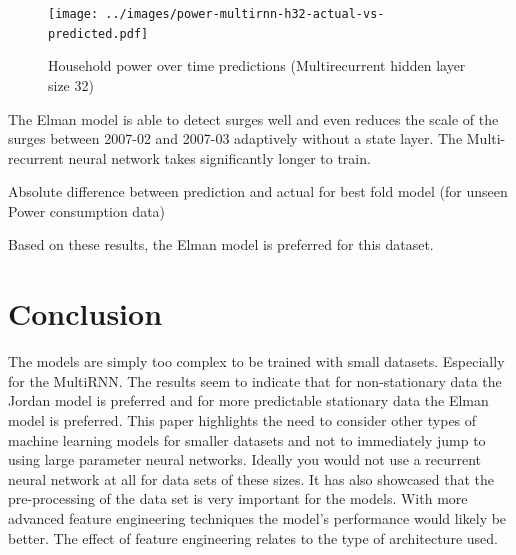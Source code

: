 \documentclass[conference]{IEEEtran}
\begin{document}
\begin{figure}[H] 
	\centering
	\texttt{[image: ../images/power-multirnn-h32-actual-vs-predicted.pdf]}
	\caption{Household power over time predictions (Multirecurrent hidden layer size 32)}
	\label{fig:power-predictions-multi}
\end{figure}

The Elman model is able to detect surges well and even reduces the scale of the surges between 2007-02 and 2007-03 adaptively without a state layer. The Multi-recurrent neural network takes significantly longer to train.

\begin{table}[H]
	\caption{Absolute difference between prediction and actual for best fold model (for unseen Power consumption data)}
	\label{tab:power-rnn-summary}
\end{table}

Based on these results, the Elman model is preferred for this dataset.

\section{Conclusion}

The models are simply too complex to be trained with small datasets. Especially for the MultiRNN. The results seem to indicate that for non-stationary data the Jordan model is preferred and for more predictable stationary data the Elman model is preferred. This paper highlights the need to consider other types of machine learning models for smaller datasets and not to immediately jump to using large parameter neural networks. Ideally you would not use a recurrent neural network at all for data sets of these sizes. It has also showcased that the pre-processing of the data set is very important for the models. With more advanced feature engineering techniques the model's performance would likely be better. The effect of feature engineering relates to the type of architecture used. 

\nocite{*}


\end{document}
